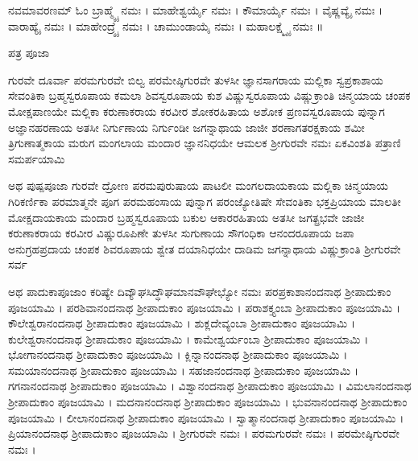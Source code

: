 ನವಮಾವರಣಮ್
ಓಂ ಬ್ರಾಹ್ಮ್ಯೈ ನಮಃ ।
ಮಾಹೇಶ್ವರ್ಯೈ ನಮಃ ।
ಕೌಮಾರ್ಯೈ ನಮಃ ।
ವೈಷ್ಣವ್ಯೈ ನಮಃ ।
ವಾರಾಹ್ಯೈ ನಮಃ ।
ಮಾಹೇಂದ್ರ್ಯೈ ನಮಃ ।
ಚಾಮುಂಡಾಯೈ ನಮಃ ।
ಮಹಾಲಕ್ಷ್ಮ್ಯೈ ನಮಃ ॥


ಪತ್ರ ಪೂಜಾ 

ಗುರವೇ ದೂರ್ವಾ
ಪರಮಗುರವೇ ಬಿಲ್ವ
ಪರಮೇಷ್ಠಿಗುರವೇ ತುಳಸೀ
ಜ್ಞಾನಸಾಗರಾಯ ಮಲ್ಲಿಕಾ
ಸ್ವಪ್ರಕಾಶಾಯ ಸೇವಂತಿಕಾ
ಬ್ರಹ್ಮಸ್ವರೂಪಾಯ ಕಮಲಾ
ಶಿವಸ್ವರೂಪಾಯ ಕುಶ
ವಿಷ್ಣುಸ್ವರೂಪಾಯ ವಿಷ್ಣುಕ್ರಾಂತಿ
ಚಿನ್ಮಯಾಯ ಚಂಪಕ
ಮೋಕ್ಷಪಾಣಯೇ ಮಲ್ಲಿಕಾ
ಕರುಣಾಕರಾಯ ಕರವೀರ
ಶೋಕರಹಿತಾಯ ಅಶೋಕ
ಪ್ರಣವಸ್ವರೂಪಾಯ ಪುನ್ನಾಗ
ಅಜ್ಞಾನಹರಣಾಯ ಅತಸೀ
ನಿರ್ಗುಣಾಯ ನಿರ್ಗುಂಡೀ
ಜಗನ್ನಾಥಾಯ ಜಾಜೀ
ಶರಣಾಗತರಕ್ಷಕಾಯ ಶಮೀ
ತ್ರಿಗುಣಾತ್ಮಕಾಯ ಮರುಗ
ಮಂಗಲಾಯ ಮಂದಾರ
ಜ್ಞಾನನಿಧಯೇ ಆಮಲಕ
ಶ್ರೀಗುರವೇ ನಮಃ ಏಕವಿಂಶತಿ ಪತ್ರಾಣಿ ಸಮರ್ಪಯಾಮಿ



ಅಥ ಪುಷ್ಪಪೂಜಾ
ಗುರವೇ ದ್ರೋಣ
ಪರಮಪುರುಷಾಯ ಪಾಟಲೀ
ಮಂಗಲದಾಯಕಾಯ ಮಲ್ಲಿಕಾ
ಚಿನ್ಮಯಾಯ ಗಿರಿಕರ್ಣಿಕಾ
ಪರಮಾತ್ಮನೇ ಪೂಗ
ಪರಮಹಂಸಾಯ ಪುನ್ನಾಗ
ಪರಂಜ್ಯೋತಿಷೇ ಸೇವಂತಿಕಾ
ಭಕ್ತಪ್ರಿಯಾಯ ಮಾಲತೀ
ಮೋಕ್ಷದಾಯಕಾಯ ಮಂದಾರ
ಬ್ರಹ್ಮಸ್ವರೂಪಾಯ ಬಕುಲ
ಆಕಾರರಹಿತಾಯ ಅತಸೀ
ಜಗತ್ಪ್ರಭವೇ ಜಾಜೀ
ಕರುಣಾಕರಾಯ ಕರವೀರ
ವಿಷ್ಣುರೂಪಿಣೇ ತುಳಸೀ
ಸುಗುಣಾಯ ಸೌಗಂಧಿಕಾ
ಆನಂದರೂಪಾಯ ಜಪಾ
ಅನುಗ್ರಹಪ್ರದಾಯ ಚಂಪಕ
ಶಿವರೂಪಾಯ ಶ್ವೇತ
ದಯಾನಿಧಯೇ ದಾಡಿಮ
ಜಗನ್ನಾಥಾಯ ವಿಷ್ಣುಕ್ರಾಂತಿ
ಶ್ರೀಗುರವೇ ಸರ್ವ


ಅಥ ಪಾದುಕಾಪೂಜಾಂ ಕರಿಷ್ಯೇ
ದಿವ್ಯೌಘಸಿದ್ಧೌಘಮಾನವೌಘೇಭ್ಯೋ ನಮಃ
ಪರಪ್ರಕಾಶಾನಂದನಾಥ ಶ್ರೀಪಾದುಕಾಂ ಪೂಜಯಾಮಿ ।
ಪರಶಿವಾನಂದನಾಥ ಶ್ರೀಪಾದುಕಾಂ ಪೂಜಯಾಮಿ ।
ಪರಾಶಕ್ತ್ಯಂಬಾ ಶ್ರೀಪಾದುಕಾಂ ಪೂಜಯಾಮಿ ।
ಕೌಲೇಶ್ವರಾನಂದನಾಥ ಶ್ರೀಪಾದುಕಾಂ ಪೂಜಯಾಮಿ ।
ಶುಕ್ಲದೇವ್ಯಂಬಾ ಶ್ರೀಪಾದುಕಾಂ ಪೂಜಯಾಮಿ ।
ಕುಲೇಶ್ವರಾನಂದನಾಥ ಶ್ರೀಪಾದುಕಾಂ ಪೂಜಯಾಮಿ ।
ಕಾಮೇಶ್ವರ್ಯಂಬಾ ಶ್ರೀಪಾದುಕಾಂ ಪೂಜಯಾಮಿ ।
ಭೋಗಾನಂದನಾಥ ಶ್ರೀಪಾದುಕಾಂ ಪೂಜಯಾಮಿ ।
ಕ್ಲಿನ್ನಾನಂದನಾಥ ಶ್ರೀಪಾದುಕಾಂ ಪೂಜಯಾಮಿ ।
ಸಮಯಾನಂದನಾಥ ಶ್ರೀಪಾದುಕಾಂ ಪೂಜಯಾಮಿ ।
ಸಹಜಾನಂದನಾಥ  ಶ್ರೀಪಾದುಕಾಂ ಪೂಜಯಾಮಿ ।
ಗಗನಾನಂದನಾಥ ಶ್ರೀಪಾದುಕಾಂ ಪೂಜಯಾಮಿ ।
ವಿಶ್ವಾನಂದನಾಥ ಶ್ರೀಪಾದುಕಾಂ ಪೂಜಯಾಮಿ ।
ವಿಮಲಾನಂದನಾಥ ಶ್ರೀಪಾದುಕಾಂ ಪೂಜಯಾಮಿ ।
ಮದನಾನಂದನಾಥ ಶ್ರೀಪಾದುಕಾಂ ಪೂಜಯಾಮಿ ।
ಭುವನಾನಂದನಾಥ ಶ್ರೀಪಾದುಕಾಂ ಪೂಜಯಾಮಿ ।
ಲೀಲಾನಂದನಾಥ ಶ್ರೀಪಾದುಕಾಂ ಪೂಜಯಾಮಿ ।
ಸ್ವಾತ್ಮಾನಂದನಾಥ ಶ್ರೀಪಾದುಕಾಂ ಪೂಜಯಾಮಿ ।
ಪ್ರಿಯಾನಂದನಾಥ ಶ್ರೀಪಾದುಕಾಂ ಪೂಜಯಾಮಿ ।
ಶ್ರೀಗುರವೇ ನಮಃ ।
ಪರಮಗುರವೇ ನಮಃ ।
ಪರಮೇಷ್ಠಿಗುರವೇ ನಮಃ ।



